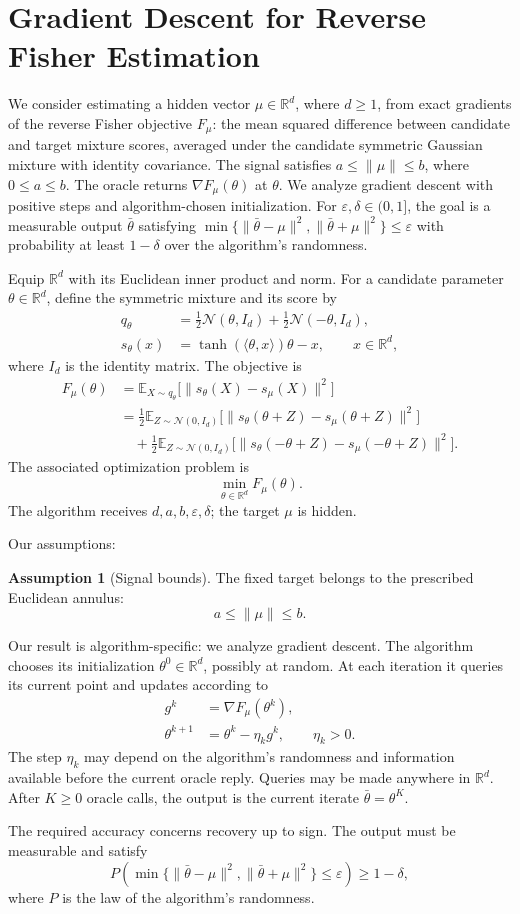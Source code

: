 \documentclass[10pt]{article}
\theoremstyle{definition}
\newtheorem{assumption}{Assumption}
\begin{document}
\section*{Gradient Descent for Reverse Fisher Estimation}
We consider estimating a hidden vector $\mu\in\mathbb{R}^d$, where $d\geq1$, from exact gradients of the reverse Fisher objective $F_\mu$: the mean squared difference between candidate and target mixture scores, averaged under the candidate symmetric Gaussian mixture with identity covariance. The signal satisfies $a\leq\|\mu\|\leq b$, where $0\leq a\leq b$. The oracle returns $\nabla F_\mu(\theta)$ at $\theta$. We analyze gradient descent with positive steps and algorithm-chosen initialization. For $\varepsilon,\delta\in(0,1]$, the goal is a measurable output $\bar{\theta}$ satisfying $\min\{\|\bar{\theta}-\mu\|^2,\|\bar{\theta}+\mu\|^2\}\leq\varepsilon$ with probability at least $1-\delta$ over the algorithm's randomness.

Equip $\mathbb{R}^d$ with its Euclidean inner product and norm. For a candidate parameter $\theta\in\mathbb{R}^d$, define the symmetric mixture and its score by
\[
\begin{aligned}
q_\theta&=\tfrac12\mathcal{N}(\theta,I_d)
          +\tfrac12\mathcal{N}(-\theta,I_d),\\
s_\theta(x)&=\tanh(\langle\theta,x\rangle)\theta-x,
\qquad x\in\mathbb{R}^d,
\end{aligned}
\]
where $I_d$ is the identity matrix. The objective is
\[
\begin{aligned}
F_\mu(\theta)
&=\mathbb{E}_{X\sim q_\theta}
  \bigl[\|s_\theta(X)-s_\mu(X)\|^2\bigr]\\
&=\tfrac12\mathbb{E}_{Z\sim\mathcal{N}(0,I_d)}
  \bigl[\|s_\theta(\theta+Z)-s_\mu(\theta+Z)\|^2\bigr]\\
&\quad+\tfrac12\mathbb{E}_{Z\sim\mathcal{N}(0,I_d)}
  \bigl[\|s_\theta(-\theta+Z)-s_\mu(-\theta+Z)\|^2\bigr].
\end{aligned}
\]
The associated optimization problem is
\[
\min_{\theta\in\mathbb{R}^d} F_\mu(\theta).
\]
The algorithm receives $d,a,b,\varepsilon,\delta$; the target $\mu$ is hidden.

Our assumptions:
\begin{assumption}[Signal bounds]
The fixed target belongs to the prescribed Euclidean annulus:
\[
a\leq\|\mu\|\leq b.
\]
\end{assumption}

Our result is algorithm-specific: we analyze gradient descent. The algorithm chooses its initialization $\theta^0\in\mathbb{R}^d$, possibly at random. At each iteration it queries its current point and updates according to
\[
\begin{aligned}
g^k&=\nabla F_\mu(\theta^k),\\
\theta^{k+1}&=\theta^k-\eta_k g^k,
\qquad \eta_k>0.
\end{aligned}
\]
The step $\eta_k$ may depend on the algorithm's randomness and information available before the current oracle reply. Queries may be made anywhere in $\mathbb{R}^d$. After $K\geq0$ oracle calls, the output is the current iterate $\bar{\theta}=\theta^K$.

The required accuracy concerns recovery up to sign. The output must be measurable and satisfy
\[
P\!\left(
\min\{\|\bar{\theta}-\mu\|^2,\|\bar{\theta}+\mu\|^2\}
\leq\varepsilon
\right)\geq1-\delta,
\]
where $P$ is the law of the algorithm's randomness.
\end{document}

